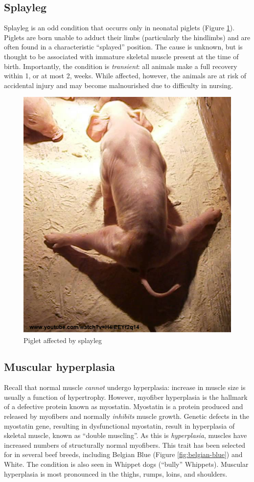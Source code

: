 \documentclass[openany]{report}
\begin{document}
\subsection{Splayleg}\label{splayleg}

Splayleg is an odd condition that occurrs only in neonatal piglets
(Figure \ref{fig:splayleg}). Piglets are born unable to adduct their
limbs (particularly the hindlimbs) and are often found in a
characteristic ``splayed'' position. The cause is unknown, but is
thought to be associated with immature skeletal muscle present at the
time of birth. Importantly, the condition is \emph{transient}: all
animals make a full recovery within 1, or at most 2, weeks. While
affected, however, the animals are at risk of accidental injury and may
become malnourished due to difficulty in nursing.

\begin{figure}

{\centering \includegraphics[width=0.6\linewidth]{images/splayleg} 

}

\caption{Piglet affected by splayleg}\label{fig:splayleg}
\end{figure}

\subsection{Muscular hyperplasia}\label{muscular-hyperplasia}

Recall that normal muscle \emph{cannot} undergo hyperplasia: increase in
muscle size is usually a function of hypertrophy. However, myofiber
hyperplasia is the hallmark of a defective protein known as myostatin.
Myostatin is a protein produced and released by myofibers and normally
\emph{inhibits} muscle growth. Genetic defects in the myostatin gene,
resulting in dysfunctional myostatin, result in hyperplasia of skeletal
muscle, known as ``double muscling''. As this is \emph{hyperplasia},
muscles have increased numbers of structurally normal myofibers. This
trait has been selected for in several beef breeds, including Belgian
Blue (Figure \ref{fig:belgian-blue}) and White. The condition is also
seen in Whippet dogs (``bully'' Whippets). Muscular hyperplasia is most
pronounced in the thighs, rumps, loins, and shoulders.
\end{document}
